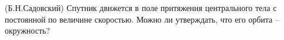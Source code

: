 (Б.Н.Садовский)
Спутник движется в поле притяжения центрального тела с постоянной по
величине скоростью. Можно ли утверждать, что его орбита – окружность?
